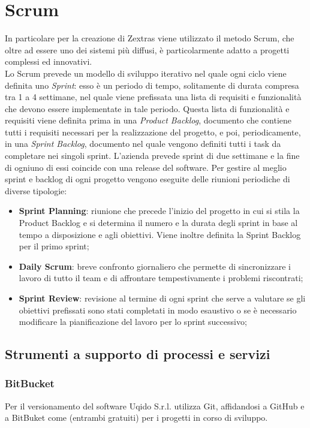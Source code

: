 \section{Scrum}
In particolare per la creazione di Zextras viene utilizzato il metodo Scrum, che oltre ad essere uno dei sistemi più diffusi, è particolarmente adatto a progetti complessi ed innovativi.\\
Lo Scrum prevede un modello di sviluppo iterativo nel quale ogni ciclo viene definita uno \emph{Sprint}: esso è un periodo di tempo, solitamente di durata compresa tra 1 a 4 settimane, nel quale viene prefissata una lista di requisiti e funzionalità che devono essere implementate in tale periodo.
Questa lista di funzionalità e requisiti viene definita prima in una \emph{Product Backlog}, documento che contiene tutti i requisiti necessari per la realizzazione del progetto, e poi, periodicamente, in una \emph{Sprint Backlog}, documento nel quale vengono definiti tutti i task da completare nei singoli sprint.
L'azienda prevede sprint di due settimane e la fine di ogniuno di essi coincide con una release del software.
Per gestire al meglio sprint e backlog di ogni progetto vengono eseguite delle riunioni periodiche di diverse tipologie:
\begin{itemize}
	\item \textbf{Sprint Planning}: riunione che precede l'inizio del progetto in cui si stila la Product Backlog e si determina il numero e la durata degli sprint in base al tempo a disposizione e agli obiettivi. Viene inoltre definita la Sprint Backlog per il primo sprint;
	\item \textbf{Daily Scrum}: breve confronto giornaliero che permette di sincronizzare i lavoro di tutto il team e di affrontare tempestivamente i problemi riscontrati;
	\item \textbf{Sprint Review}: revisione al termine di ogni sprint che serve a valutare se gli obiettivi prefissati sono stati completati in modo esaustivo o se è necessario modificare la pianificazione del lavoro per lo sprint successivo;
\end{itemize}



\subsection{Strumenti a supporto di processi e servizi}
\subsubsection{BitBucket}
Per il versionamento del software Uqido S.r.l. utilizza Git, affidandosi a GitHub
e a BitBuket come  (entrambi gratuiti) per i progetti in corso
di sviluppo.
